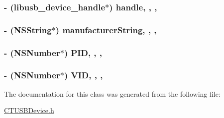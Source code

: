 \hypertarget{interface_c_t_u_s_b_device_a76090dc447b52913d038e07dfe672f5a}{
\subsubsection[{handle}]{\setlength{\rightskip}{0pt plus 5cm}-\/ (libusb\-\_\-device\-\_\-handle$\ast$) handle\hspace{0.3cm}{\ttfamily [read]}, {\ttfamily [write]}, {\ttfamily [atomic]}, {\ttfamily [assign]}}}\label{interface_c_t_u_s_b_device_a76090dc447b52913d038e07dfe672f5a}
\hypertarget{interface_c_t_u_s_b_device_a65ff7b894401291eabdaefe0182d41aa}{
\subsubsection[{manufacturer\-String}]{\setlength{\rightskip}{0pt plus 5cm}-\/ (N\-S\-String$\ast$) manufacturer\-String\hspace{0.3cm}{\ttfamily [read]}, {\ttfamily [write]}, {\ttfamily [atomic]}, {\ttfamily [copy]}}}\label{interface_c_t_u_s_b_device_a65ff7b894401291eabdaefe0182d41aa}
\hypertarget{interface_c_t_u_s_b_device_a455ff3ce8f9e14f91139a4f62558aa80}{
\subsubsection[{P\-I\-D}]{\setlength{\rightskip}{0pt plus 5cm}-\/ (N\-S\-Number$\ast$) P\-I\-D\hspace{0.3cm}{\ttfamily [read]}, {\ttfamily [write]}, {\ttfamily [atomic]}, {\ttfamily [retain]}}}\label{interface_c_t_u_s_b_device_a455ff3ce8f9e14f91139a4f62558aa80}
\hypertarget{interface_c_t_u_s_b_device_ac0c96b6d796529bf0c38611c9b412896}{
\subsubsection[{V\-I\-D}]{\setlength{\rightskip}{0pt plus 5cm}-\/ (N\-S\-Number$\ast$) V\-I\-D\hspace{0.3cm}{\ttfamily [read]}, {\ttfamily [write]}, {\ttfamily [atomic]}, {\ttfamily [retain]}}}\label{interface_c_t_u_s_b_device_ac0c96b6d796529bf0c38611c9b412896}


The documentation for this class was generated from the following file\-:\begin{DoxyCompactItemize}
\item 
\hyperlink{_c_t_u_s_b_device_8h}{C\-T\-U\-S\-B\-Device.\-h}\end{DoxyCompactItemize}
